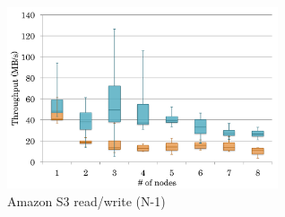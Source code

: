 % 
% 

\begin{figure}[t]
\centering
\label{background:amazon s3 read write same file}
\includegraphics[width=8cm]{img/s3_read_same_file-2}
\caption{Amazon S3 read/write (N-1)}
\end{figure}

